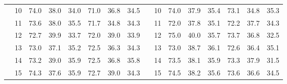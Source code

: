 \begin{table}[p]
{\begin{tabular}{c c | c c c | c c c || c c | c c c | c c c}
             & 10 & 74.0 & 38.0 & 34.0 & 71.0 & 36.8 & 34.5 &  & 10 & 74.0 & 37.9 & 35.4 & 73.1 & 34.8 & 35.3 \\
             & 11 & 73.6 & 38.0 & 35.5 & 71.7 & 34.8 & 34.3 &  & 11 & 72.0 & 37.8 & 35.1 & 72.2 & 37.7 & 34.3 \\
             & 12 & 72.7 & 39.9 & 33.7 & 72.0 & 39.0 & 33.9 &  & 12 & 75.0 & 40.0 & 35.7 & 73.7 & 36.8 & 32.5 \\
             & 13 & 73.0 & 37.1 & 35.2 & 72.5 & 36.3 & 34.3 &  & 13 & 73.0 & 38.7 & 36.1 & 72.6 & 36.4 & 35.1 \\
             & 14 & 73.2 & 39.0 & 35.9 & 72.5 & 36.8 & 35.8 &  & 14 & 73.5 & 38.1 & 35.9 & 73.3 & 37.9 & 31.5 \\
             & 15 & 74.3 & 37.6 & 35.9 & 72.7 & 39.0 & 34.3 &  & 15 & 74.5 & 38.2 & 35.6 & 73.6 & 36.6 & 34.5 \\
    \bottomrule
\end{tabular}%
}
\label{tab:duration_distal_intermediate_group}
\end{table}

